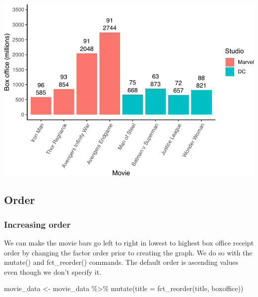\documentclass[
]{krantz}
\makeatletter
\newenvironment{Shaded}{\begin{snugshade}}{\end{snugshade}}
\newcommand{\AttributeTok}[1]{\textcolor[rgb]{0.61,0.61,0.61}{#1}}
\newcommand{\FunctionTok}[1]{\textcolor[rgb]{0,0,0}{#1}}
\newcommand{\NormalTok}[1]{#1}
\newcommand{\OtherTok}[1]{\textcolor[rgb]{0.37,0.37,0.37}{#1}}
\newcommand{\SpecialCharTok}[1]{\textcolor[rgb]{0,0,0}{#1}}
\newenvironment{kframe}{%
\medskip{}
\setlength{\fboxsep}{.8em}
 \def\at@end@of@kframe{}%
 \ifinner\ifhmode%
  \def\at@end@of@kframe{\end{minipage}}%
  \begin{minipage}{\columnwidth}%
 \fi\fi%
 \def\FrameCommand##1{\hskip\@totalleftmargin \hskip-\fboxsep
 \colorbox{shadecolor}{##1}\hskip-\fboxsep
     \hskip-\linewidth \hskip-\@totalleftmargin \hskip\columnwidth}%
 \MakeFramed {\advance\hsize-\width
   \@totalleftmargin\z@ \linewidth\hsize
   \@setminipage}}%
 {\par\unskip\endMakeFramed%
 \at@end@of@kframe}
\renewenvironment{Shaded}{\begin{kframe}}{\end{kframe}}
\makeatother
\begin{document}
\includegraphics[width=0.65\linewidth]{bookdown_files/figure-latex/unnamed-chunk-215-1}

\hypertarget{order}{%
\subsection{Order}\label{order}}

\hypertarget{increasing-order}{%
\subsubsection{Increasing order}\label{increasing-order}}

We can make the movie bars go left to right in lowest to highest box office receipt order by changing the factor order prior to creating the graph. We do so with the mutate() and fct\_reorder() commands. The default order is ascending values even though we don't specify it.

\begin{Shaded}
\begin{Highlighting}[]
\NormalTok{movie\_data }\OtherTok{\textless{}{-}}\NormalTok{ movie\_data }\SpecialCharTok{\%\textgreater{}\%} 
  \FunctionTok{mutate}\NormalTok{(}\AttributeTok{title =} \FunctionTok{fct\_reorder}\NormalTok{(title,}
\NormalTok{                             boxoffice))}
\end{Highlighting}
\end{Shaded}
\end{document}
